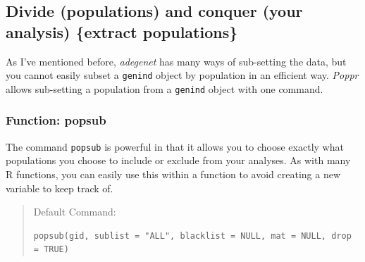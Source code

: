 \documentclass[letterpaper]{article}\usepackage[]{graphicx}\usepackage[]{color}
\makeatletter
\newenvironment{kframe}{%
 \def\at@end@of@kframe{}%
 \ifinner\ifhmode%
  \def\at@end@of@kframe{\end{minipage}}%
  \begin{minipage}{\columnwidth}%
 \fi\fi%
 \def\FrameCommand##1{\hskip\@totalleftmargin \hskip-\fboxsep
 \colorbox{shadecolor}{##1}\hskip-\fboxsep
     \hskip-\linewidth \hskip-\@totalleftmargin \hskip\columnwidth}%
 \MakeFramed {\advance\hsize-\width
   \@totalleftmargin\z@ \linewidth\hsize
   \@setminipage}}%
 {\par\unskip\endMakeFramed%
 \at@end@of@kframe}
\newenvironment{knitrout}{}{} %
\newcommand{\tab}{\hspace*{1em}}
\makeatother
\begin{document}
\subsection{Divide (populations) and conquer (your analysis) \{extract populations\}}\label{data.manip:divide}

\tab\tab As I've mentioned before, \textit{adegenet} has many ways of sub-setting the data, but you cannot easily subset a \texttt{genind} object by population in an efficient way. \textit{Poppr} allows sub-setting a population from a \texttt{genind} object with one command.
\subsubsection{Function: popsub}\label{data.manip:divide:popsub}

\tab\tab The command \texttt{popsub} is powerful in that it allows you to choose exactly what populations you choose to include or exclude from your analyses. As with many R functions, you can easily use this within a function to avoid creating a new variable to keep track of.  
\begin{quote}
Default Command:
\begin{knitrout}
\color{fgcolor}\begin{kframe}
\begin{verbatim}
popsub(gid, sublist = "ALL", blacklist = NULL, mat = NULL, drop = TRUE)
\end{verbatim}
\end{kframe}
\end{knitrout}

\end{quote}
\end{document}
